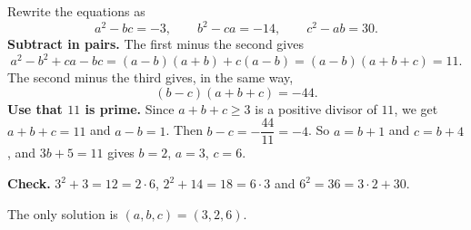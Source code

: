 Rewrite the equations as
\[
a^2-bc=-3,\qquad b^2-ca=-14,\qquad c^2-ab=30 .
\]
\textbf{Subtract in pairs.} The first minus the second gives
\[
a^2-b^2+ca-bc=(a-b)(a+b)+c(a-b)=(a-b)(a+b+c)=11 .
\]
The second minus the third gives, in the same way,
\[
(b-c)(a+b+c)=-44 .
\]
\textbf{Use that $11$ is prime.} Since $a+b+c\ge3$ is a positive divisor of $11$, we get $a+b+c=11$ and $a-b=1$. Then $b-c=-\dfrac{44}{11}=-4$. So $a=b+1$ and $c=b+4$, and $3b+5=11$ gives $b=2$, $a=3$, $c=6$.

\textbf{Check.} $3^2+3=12=2\cdot6$, $2^2+14=18=6\cdot3$ and $6^2=36=3\cdot2+30$.

The only solution is $\boxed{(a,b,c)=(3,2,6)}$.
